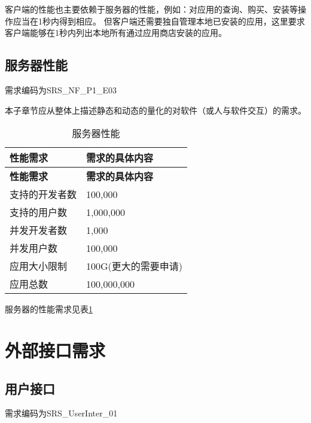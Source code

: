 客户端的性能也主要依赖于服务器的性能，例如：对应用的查询、购买、安装等操作应当在1秒内得到相应。
但客户端还需要独自管理本地已安装的应用，这里要求客户端能够在1秒内列出本地所有通过应用商店安装的应用。

\subsection{服务器性能}
需求编码为SRS\_NF\_P1\_E03

本子章节应从整体上描述静态和动态的量化的对软件（或人与软件交互）的需求。

\begin{longtable}{|p{4cm}|p{10cm}|}
\caption{服务器性能}\label{tab:concrete_performance_server} \\
\hline
\textbf{性能需求} & \textbf{需求的具体内容}     \\
\hline
\endfirsthead
\hline
\textbf{性能需求} & \textbf{需求的具体内容}    \\
\hline
\endhead
\hline 
\endfoot
\hline
\endlastfoot
支持的开发者数 & 100,000 \\
支持的用户数 & 1,000,000 \\
并发开发者数 & 1,000 \\
并发用户数 & 100,000 \\
应用大小限制 & 100G(更大的需要申请)\\
应用总数 & 100,000,000 \\
\end{longtable}

服务器的性能需求见表\ref{tab:concrete_performance_server}

\section{外部接口需求}
\subsection{用户接口}
需求编码为SRS\_UserInter\_01

